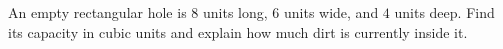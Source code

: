 An empty rectangular hole is $8$ units long, $6$ units wide, and $4$ units deep. Find its capacity in cubic units and explain how much dirt is currently inside it.
